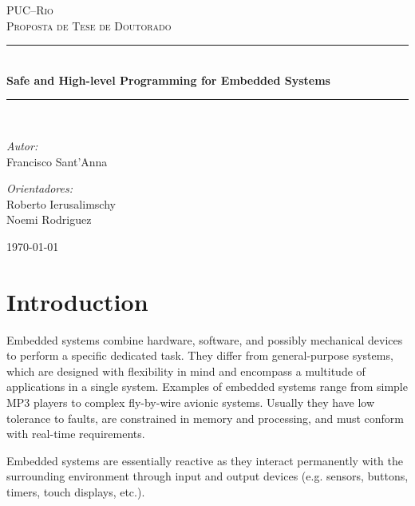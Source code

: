 \documentclass[pdftex,12pt,a4paper]{article}
\begin{document}
\begin{titlepage}
\begin{center}

\textsc{\LARGE PUC--Rio}\\[1.5cm]
\textsc{\Large Proposta de Tese de Doutorado}\\[0.5cm]

\newcommand{\HRule}{\rule{\linewidth}{0.5mm}}
\HRule \\[0.4cm]
{ \huge \bfseries Safe and High-level Programming for Embedded Systems}\\[0.4cm]
\HRule \\[1.5cm]

\begin{minipage}{0.4\textwidth}
\begin{flushleft} \large
\emph{Autor:}\\
Francisco Sant'Anna
\end{flushleft}
\end{minipage}
\begin{minipage}{0.4\textwidth}
\begin{flushright} \large
\emph{Orientadores:} \\
Roberto Ierusalimschy \\
Noemi Rodriguez
\end{flushright}
\end{minipage}

\vfill
{\large \today}
\end{center}
\end{titlepage}

\tableofcontents

\section{Introduction}
\label{sec:introduction}

Embedded systems combine hardware, software, and possibly mechanical devices to 
perform a specific dedicated task.
They differ from general-purpose systems, which are designed with flexibility 
in mind and encompass a multitude of applications in a single system.
Examples of embedded systems range from simple MP3 players to complex 
fly-by-wire avionic systems.
Usually they have low tolerance to faults, are constrained in memory and 
processing, and must conform with real-time requirements.~\cite{es.lee}

Embedded systems are essentially reactive as they interact permanently with the 
surrounding environment through input and output devices (e.g. sensors, 
buttons, timers, touch displays, etc.).
\end{document}
